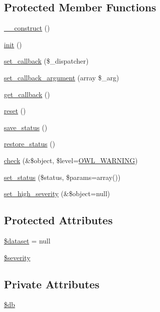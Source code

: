 \subsection*{Protected Member Functions}
\begin{DoxyCompactItemize}
\item 
\hyperlink{classSessionHandler_a546ba6d31a1ce532de13f65aadc3be0e}{\_\-\_\-construct} ()
\item 
\hyperlink{class__OWL_ae0ef3ded56e8a6b34b6461e5a721cd3e}{init} ()
\item 
\hyperlink{class__OWL_a28d9025eaf37b49d63cb334ed28c33f0}{set\_\-callback} (\$\_\-dispatcher)
\item 
\hyperlink{class__OWL_a1e26611ce858b237f5a98a91ea3c3a1b}{set\_\-callback\_\-argument} (array \$\_\-arg)
\item 
\hyperlink{class__OWL_abded13b1c97ea6e0cfe3c68cb6bcf7a5}{get\_\-callback} ()
\item 
\hyperlink{class__OWL_a2f2a042bcf31965194c03033df0edc9b}{reset} ()
\item 
\hyperlink{class__OWL_a9e49b9c76fbc021b244c6915ea536d71}{save\_\-status} ()
\item 
\hyperlink{class__OWL_a465eeaf40edd9f9c848841700c32ce55}{restore\_\-status} ()
\item 
\hyperlink{class__OWL_ae2e3c56e5f3c4ce4156c6b1bb1c50f63}{check} (\&\$object, \$level=\hyperlink{owl_8severitycodes_8php_ace886152e2e86cd2e91cb833fd495adb}{OWL\_\-WARNING})
\item 
\hyperlink{class__OWL_aea912d0ede9b3c2a69b79072d94d4787}{set\_\-status} (\$status, \$params=array())
\item 
\hyperlink{class__OWL_a576829692a3b66e3d518853bf43abae3}{set\_\-high\_\-severity} (\&\$object=null)
\end{DoxyCompactItemize}
\subsection*{Protected Attributes}
\begin{DoxyCompactItemize}
\item 
\hyperlink{classSessionHandler_a74c46fcfbadd4c4e6bacc73ddf350056}{\$dataset} = null
\item 
\hyperlink{class__OWL_ad26b40a9dbbacb33e299b17826f8327c}{\$severity}
\end{DoxyCompactItemize}
\subsection*{Private Attributes}
\begin{DoxyCompactItemize}
\item 
\hyperlink{classSessionHandler_a0bb7c3206f3664f2a4b8e96edf49a3bc}{\$db}
\end{DoxyCompactItemize}


